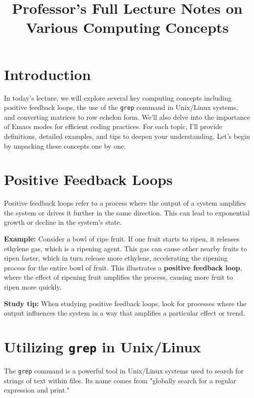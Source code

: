 \documentclass{article}
\title{Professor's Full Lecture Notes on Various Computing Concepts}
\date{}
\begin{document}
\maketitle

\tableofcontents

\newpage

\section{Introduction}

In today's lecture, we will explore several key computing concepts including positive feedback loops, the use of the \texttt{grep} command in Unix/Linux systems, and converting matrices to row echelon form. We'll also delve into the importance of Emacs modes for efficient coding practices. For each topic, I'll provide definitions, detailed examples, and tips to deepen your understanding. Let's begin by unpacking these concepts one by one.

\section{Positive Feedback Loops}

Positive feedback loops refer to a process where the output of a system amplifies the system or drives it further in the same direction. This can lead to exponential growth or decline in the system's state.

\textbf{Example:} Consider a bowl of ripe fruit. If one fruit starts to ripen, it releases ethylene gas, which is a ripening agent. This gas can cause other nearby fruits to ripen faster, which in turn release more ethylene, accelerating the ripening process for the entire bowl of fruit. This illustrates a \textbf{positive feedback loop}, where the effect of ripening fruit amplifies the process, causing more fruit to ripen more quickly.

\textbf{Study tip:} When studying positive feedback loops, look for processes where the output influences the system in a way that amplifies a particular effect or trend.

\section{Utilizing \texttt{grep} in Unix/Linux}

The \texttt{grep} command is a powerful tool in Unix/Linux systems used to search for strings of text within files. Its name comes from "globally search for a regular expression and print."
\end{document}
